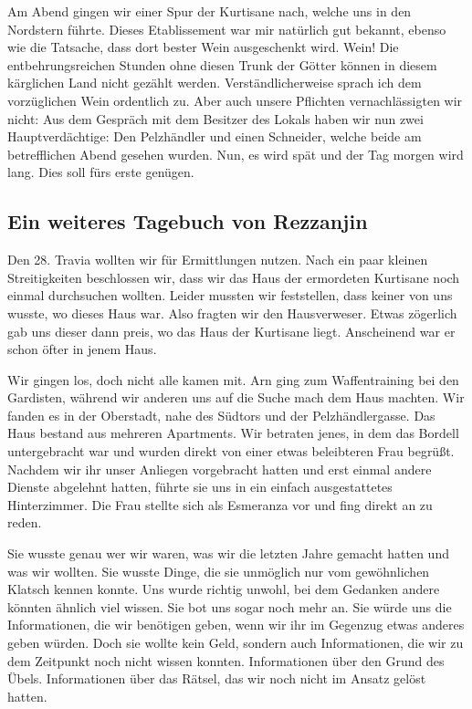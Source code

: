 \documentclass[11pt]{scrreprt}
\begin{document}
Am Abend gingen wir einer Spur der Kurtisane nach, welche uns in den Nordstern führte. Dieses Etablissement war mir natürlich gut bekannt, ebenso wie die Tatsache, dass dort bester Wein ausgeschenkt wird. Wein! Die entbehrungsreichen Stunden ohne diesen Trunk der Götter können in diesem kärglichen Land nicht gezählt werden. Verständlicherweise sprach ich dem vorzüglichen Wein ordentlich zu. Aber auch unsere Pflichten vernachlässigten wir nicht: Aus dem Gespräch mit dem Besitzer des Lokals haben wir nun zwei Hauptverdächtige: Den Pelzhändler und einen Schneider, welche beide am betrefflichen Abend gesehen wurden. Nun, es wird spät und der Tag morgen wird lang. Dies soll fürs erste genügen. \par

\subsection{Ein weiteres Tagebuch von Rezzanjin}

Den 28. Travia wollten wir für Ermittlungen nutzen. Nach ein paar kleinen Streitigkeiten beschlossen wir, dass wir das Haus der ermordeten Kurtisane noch einmal durchsuchen wollten. Leider mussten wir feststellen, dass keiner von uns wusste, wo dieses Haus war. Also fragten wir den Hausverweser. Etwas zögerlich gab uns dieser dann preis, wo das Haus der Kurtisane liegt. Anscheinend war er schon öfter in jenem Haus. \par

Wir gingen los, doch nicht alle kamen mit. Arn ging zum Waffentraining bei den Gardisten, während wir anderen uns auf die Suche mach dem Haus machten. Wir fanden es in der Oberstadt, nahe des Südtors und der Pelzhändlergasse. Das Haus bestand aus mehreren Apartments. Wir betraten jenes, in dem das Bordell untergebracht war und wurden direkt von einer etwas beleibteren Frau begrüßt. Nachdem wir ihr unser Anliegen vorgebracht hatten und erst einmal andere Dienste abgelehnt hatten, führte sie uns in ein einfach ausgestattetes Hinterzimmer. Die Frau stellte sich als Esmeranza vor und fing direkt an zu reden. \par

Sie wusste genau wer wir waren, was wir die letzten Jahre gemacht hatten und was wir wollten. Sie wusste Dinge, die sie unmöglich nur vom gewöhnlichen Klatsch kennen konnte. Uns wurde richtig unwohl, bei dem Gedanken andere könnten ähnlich viel wissen. Sie bot uns sogar noch mehr an. Sie würde uns die Informationen, die wir benötigen geben, wenn wir ihr im Gegenzug etwas anderes geben würden. Doch sie wollte kein Geld, sondern auch Informationen, die wir zu dem Zeitpunkt noch nicht wissen konnten. Informationen über den Grund des Übels. Informationen über das Rätsel, das wir noch nicht im Ansatz gelöst hatten. \par
\end{document}
